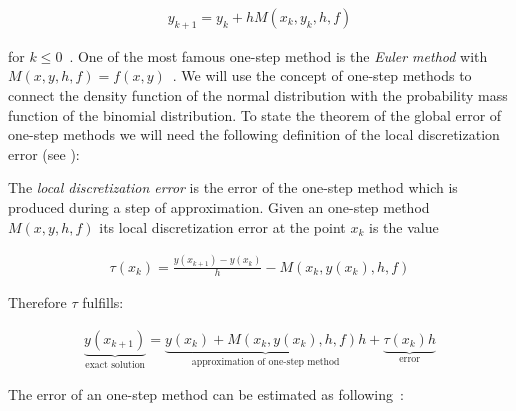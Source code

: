 \begin{align}
  y_{k+1} = y_k + h M(x_k, y_k, h, f)
\end{align}

for $k \le 0$~\cite[p. 473]{stoer}. One of the most famous one-step method is the \emph{Euler method} with $M(x,y,h,f) = f(x,y)$~\cite[p. 473]{stoer}. We will use the concept of one-step methods to connect the density function of the normal distribution with the probability mass function of the binomial distribution. To state the theorem of the global error of one-step methods we will need the following definition of the local discretization error (see \cite[pp. 473-474]{stoer}):

\begin{definition}
  The \emph{local discretization error} is the error of the one-step method which is produced during a step of approximation. Given an one-step method $M(x,y,h,f)$ its local discretization error at the point $x_k$ is the value

  \begin{align}
    \tau(x_k) = \frac{y(x_{k+1})-y(x_k)}h - M(x_k,y(x_k),h,f)
  \end{align}
\end{definition}

\noindent Therefore $\tau$ fulfills:

\begin{align}
  \underbrace{y(x_{k+1})}_{\text{exact solution}} = \underbrace{y(x_k) + M(x_k,y(x_k),h,f)h}_{\text{approximation of one-step method}} + \underbrace{\tau(x_k)h}_{\text{error}}
\end{align}

\noindent The error of an one-step method can be estimated as following~\cite[pp. 478-479]{stoer}:

